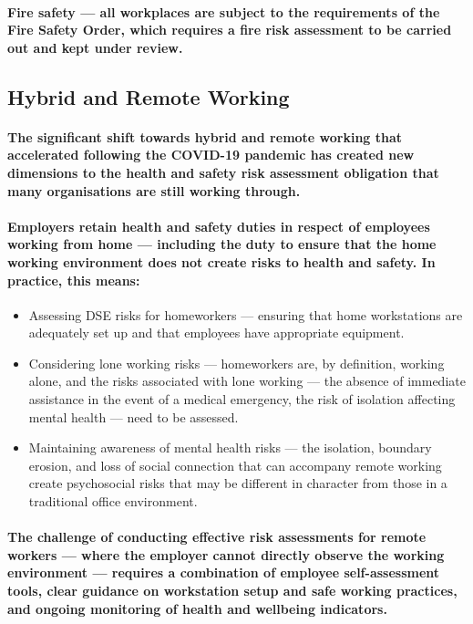 \paragraph{\textbf{Fire safety} — all workplaces are subject to the requirements of the Fire Safety Order, which requires a fire risk assessment to be carried out and kept under review.}

\subsection{Hybrid and Remote Working}
\paragraph{The significant shift towards hybrid and remote working that accelerated following the COVID-19 pandemic has created new dimensions to the health and safety risk assessment obligation that many organisations are still working through.}
\paragraph{Employers retain health and safety duties in respect of employees working from home — including the duty to ensure that the home working environment does not create risks to health and safety. In practice, this means:}
\begin{itemize}
    \item{Assessing DSE risks for homeworkers — ensuring that home workstations are adequately set up and that employees have appropriate equipment.}
    \item{Considering lone working risks — homeworkers are, by definition, working alone, and the risks associated with lone working — the absence of immediate assistance in the event of a medical emergency, the risk of isolation affecting mental health — need to be assessed.}
    \item{Maintaining awareness of mental health risks — the isolation, boundary erosion, and loss of social connection that can accompany remote working create psychosocial risks that may be different in character from those in a traditional office environment.}
\end{itemize}
\paragraph{The challenge of conducting effective risk assessments for remote workers — where the employer cannot directly observe the working environment — requires a combination of employee self-assessment tools, clear guidance on workstation setup and safe working practices, and ongoing monitoring of health and wellbeing indicators.}

